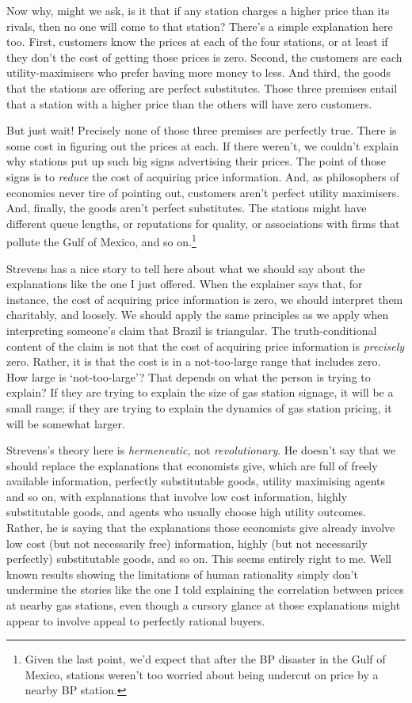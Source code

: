 \documentclass[
  10pt,
  letterpaper,
  DIV=11,
  numbers=noendperiod,
  twoside]{scrartcl}
\begin{document}
Now why, might we ask, is it that if any station charges a higher price
than its rivals, then no one will come to that station? There's a simple
explanation here too. First, customers know the prices at each of the
four stations, or at least if they don't the cost of getting those
prices is zero. Second, the customers are each utility-maximisers who
prefer having more money to less. And third, the goods that the stations
are offering are perfect substitutes. Those three premises entail that a
station with a higher price than the others will have zero customers.

But just wait! Precisely none of those three premises are perfectly
true. There is some cost in figuring out the prices at each. If there
weren't, we couldn't explain why stations put up such big signs
advertising their prices. The point of those signs is to \emph{reduce}
the cost of acquiring price information. And, as philosophers of
economics never tire of pointing out, customers aren't perfect utility
maximisers. And, finally, the goods aren't perfect substitutes. The
stations might have different queue lengths, or reputations for quality,
or associations with firms that pollute the Gulf of Mexico, and so
on.\footnote{Given the last point, we'd expect that after the BP
  disaster in the Gulf of Mexico, stations weren't too worried about
  being undercut on price by a nearby BP station.}

Strevens has a nice story to tell here about what we should say about
the explanations like the one I just offered. When the explainer says
that, for instance, the cost of acquiring price information is zero, we
should interpret them charitably, and loosely. We should apply the same
principles as we apply when interpreting someone's claim that Brazil is
triangular. The truth-conditional content of the claim is not that the
cost of acquiring price information is \emph{precisely} zero. Rather, it
is that the cost is in a not-too-large range that includes zero. How
large is `not-too-large'? That depends on what the person is trying to
explain? If they are trying to explain the size of gas station signage,
it will be a small range; if they are trying to explain the dynamics of
gas station pricing, it will be somewhat larger.

Strevens's theory here is \emph{hermeneutic}, not \emph{revolutionary}.
He doesn't say that we should replace the explanations that economists
give, which are full of freely available information, perfectly
substitutable goods, utility maximising agents and so on, with
explanations that involve low cost information, highly substitutable
goods, and agents who usually choose high utility outcomes. Rather, he
is saying that the explanations those economists give already involve
low cost (but not necessarily free) information, highly (but not
necessarily perfectly) substitutable goods, and so on. This seems
entirely right to me. Well known results showing the limitations of
human rationality simply don't undermine the stories like the one I told
explaining the correlation between prices at nearby gas stations, even
though a cursory glance at those explanations might appear to involve
appeal to perfectly rational buyers.
\end{document}
